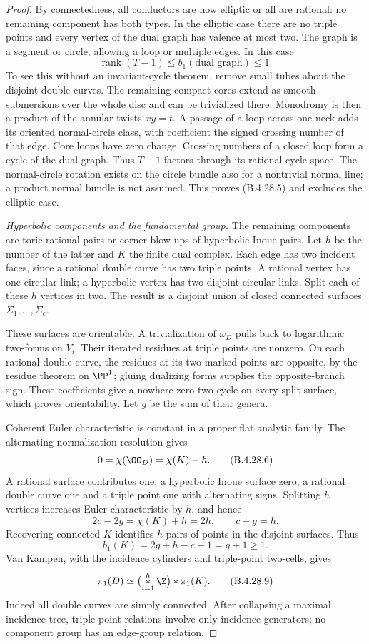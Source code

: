 \begin{proof}
By connectedness, all conductors are now elliptic or
all are rational: no remaining component has both
types. In the elliptic case there are no triple points
and every vertex of the dual graph has valence at most
two. The graph is a segment or circle, allowing a loop
or multiple edges. In this case
\[
 \operatorname{rank}(T-1)\le b_1(\text{dual graph})
 \le1.                                               \tag{B.4.28.5}
\]
To see this without an invariant-cycle theorem, remove
small tubes about the disjoint double curves. The
remaining compact cores extend as smooth submersions
over the whole disc and can be trivialized there.
Monodromy is then a product of the annular twists
$xy=t$. A passage of a loop across one neck adds its
oriented normal-circle class, with coefficient the
signed crossing number of that edge. Core loops have
zero change. Crossing numbers of a closed loop form a
cycle of the dual graph. Thus $T-1$ factors through its
rational cycle space. The normal-circle rotation exists
on the circle bundle also for a nontrivial normal line;
a product normal bundle is not assumed. This proves
(B.4.28.5) and excludes the elliptic case.

\emph{Hyperbolic components and the fundamental group.}
The remaining components are toric rational pairs or
corner blow-ups of hyperbolic Inoue pairs. Let $h$ be
the number of the latter and $K$ the finite dual complex.
Each edge has two incident faces, since a rational
double curve has two triple points. A rational vertex
has one circular link; a hyperbolic vertex has two
disjoint circular links. Split each of these $h$ vertices
in two. The result is a disjoint union of closed
connected surfaces $\Sigma_1,\ldots,\Sigma_c$.

These surfaces are orientable. A trivialization of
$\omega_D$ pulls back to logarithmic two-forms on $V_i$.
Their iterated residues at triple points are nonzero.
On each rational double curve, the residues at its
two marked points are opposite, by the residue theorem
on $\PP^1$; gluing dualizing forms supplies the
opposite-branch sign. These coefficients give a
nowhere-zero two-cycle on every split surface, which
proves orientability. Let $g$ be the sum of their genera.

Coherent Euler characteristic is constant in a proper
flat analytic family. The alternating normalization
resolution gives
\[
 0=\chi(\OO_D)=\chi(K)-h.                             \tag{B.4.28.6}
\]
A rational surface contributes one, a hyperbolic Inoue
surface zero, a rational double curve one and a triple
point one with alternating signs. Splitting $h$ vertices
increases Euler characteristic by $h$, and hence
\[
 2c-2g=\chi(K)+h=2h,\qquad c-g=h.                     \tag{B.4.28.7}
\]
Recovering connected $K$ identifies $h$ pairs of points
in the disjoint surfaces. Thus
\[
 b_1(K)=2g+h-c+1=g+1\ge1.                            \tag{B.4.28.8}
\]
Van Kampen, with the incidence cylinders and triple-point
two-cells, gives
\[
 \pi_1(D)\simeq
 \bigl(\mathop{*}_{i=1}^{h}\Z\bigr)*\pi_1(K).           \tag{B.4.28.9}
\]
Indeed all double curves are simply connected. After
collapsing a maximal incidence tree, triple-point
relations involve only incidence generators; no
component group has an edge-group relation.


\end{proof}
